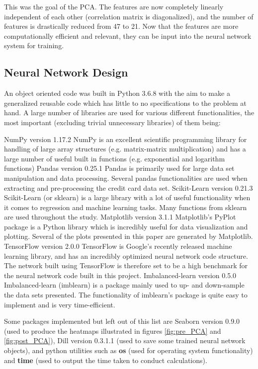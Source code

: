             This was the goal of the PCA. The features are now completely linearly independent of each other (correlation matrix is diagonalized), and the number of features is drastically reduced from 47 to 21. Now that the features are more computationally efficient and relevant, they can be input into the neural network system for training.
    
    \subsection{Neural Network Design}
        An object oriented code was built in Python 3.6.8 with the aim to make a generalized reusable code which has little to no specifications to the problem at hand. A large number of libraries are used for various different functionalities, the most important (excluding trivial unnecessary libraries) of them being:
        \begin{outline}[itemize]
            \1 NumPy version 1.17.2
                \2 NumPy is an excellent scientific programming library for handling of large array structures (e.g. matrix-matrix multiplication) and has a large number of useful built in functions (e.g. exponential and logarithm functions)
            \1 Pandas version 0.25.1
                \2 Pandas is primarily used for large data set manipulation and data processing. Several pandas functionalities are used when extracting and pre-processing the credit card data set.
            \1 Scikit-Learn version 0.21.3
                \2 Scikit-Learn (or sklearn) is a large library with a lot of useful functionality when it comes to regression and machine learning tasks. Many functions from sklearn are used throughout the study.
            \1 Matplotlib version 3.1.1
                \2 Matplotlib's PyPlot package is a Python library which is incredibly useful for data visualization and plotting. Several of the plots presented in this paper are generated by Matplotlib.
            \1 TensorFlow version 2.0.0
                \2 TensorFlow is Google's recently released machine learning library, and has an incredibly optimized neural network code structure. The network built using TensorFlow is therefore set to be a high benchmark for the neural network code built in this project.
            \1 Imbalanced-learn version 0.5.0
                \2 Imbalanced-learn (imblearn) is a package mainly used to up- and down-sample the data sets presented. The functionality of imblearn's package is quite easy to implement and is very time-efficient.
        \end{outline}
        Some packages implemented but left out of this list are Seaborn version 0.9.0 (used to produce the heatmaps illustrated in figures \ref{fig:pre_PCA} and \ref{fig:post_PCA}), Dill version 0.3.1.1 (used to save some trained neural network objects), and python utilities such as \textbf{os} (used for operating system functionality) and \textbf{time} (used to output the time taken to conduct calculations).
        
